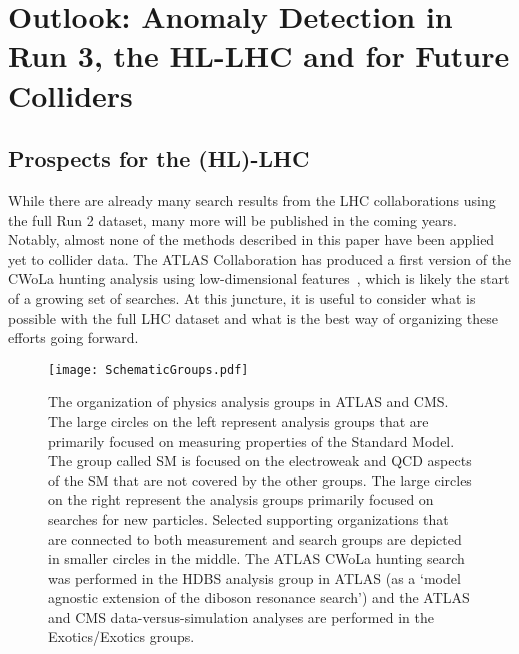 \documentclass[a4paper,11pt]{article}
\begin{document}
\clearpage

\section{Outlook: Anomaly Detection in Run 3, the HL-LHC and for Future Colliders}
\label{sec:outlook}


\subsection{Prospects for the (HL)-LHC}

While there are already many search results from the LHC collaborations using the full Run 2 dataset,  many more will be published in the coming years.  Notably, almost none of the methods described in this paper have been applied yet to collider data.  The ATLAS Collaboration has produced a first version of the CWoLa hunting analysis using low-dimensional features~\cite{collaboration2020dijet}, which is likely the start of a growing set of searches.  At this juncture, it is useful to consider what is possible with the full LHC dataset and what is the best way of organizing these efforts going forward.

\begin{figure}[h!]
\centering
\texttt{[image: SchematicGroups.pdf]}
\label{fig:groups}
\caption{The organization of physics analysis groups in ATLAS and CMS.  The large circles on the left represent analysis groups that are primarily focused on measuring properties of the Standard Model.  The group called SM is focused on the electroweak and QCD aspects of the SM that are not covered by the other groups.  The large circles on the right represent the analysis groups primarily focused on searches for new particles.  Selected supporting organizations that are connected to both measurement and search groups are depicted in smaller circles in the middle.  The ATLAS CWoLa hunting search was performed in the HDBS analysis group in ATLAS (as a `model agnostic extension of the diboson resonance search') and the ATLAS and CMS data-versus-simulation analyses are performed in the Exotics/Exotics groups.}
\end{figure}
\end{document}
